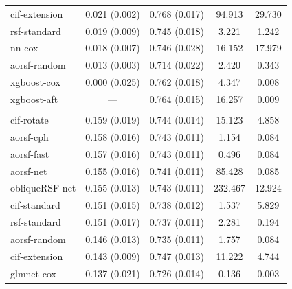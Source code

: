 \documentclass{article}\usepackage[]{graphicx}\usepackage[]{xcolor}
\newenvironment{knitrout}{}{} %
\begin{document}
\begin{knitrout}
\begin{longtable}[t]{lcccc}
\hspace{1em}cif-extension & 0.021 (0.002) & 0.768 (0.017) & 94.913 & 29.730\\
\hspace{1em}rsf-standard & 0.019 (0.009) & 0.745 (0.018) & 3.221 & 1.242\\
\hspace{1em}nn-cox & 0.018 (0.007) & 0.746 (0.028) & 16.152 & 17.979\\
\hspace{1em}aorsf-random & 0.013 (0.003) & 0.714 (0.022) & 2.420 & 0.343\\
\hspace{1em}xgboost-cox & 0.000 (0.025) & 0.762 (0.018) & 4.347 & 0.008\\
\hspace{1em}xgboost-aft & --- & 0.764 (0.015) & 16.257 & 0.009\\
\addlinespace[0.3em]
\multicolumn{5}{l}{\textit{\textbf{Monoclonal gammopathy; death, n = 1384, p = 8}}}\\
\hline
\hspace{1em}cif-rotate & 0.159 (0.019) & 0.744 (0.014) & 15.123 & 4.858\\
\hspace{1em}aorsf-cph & 0.158 (0.016) & 0.743 (0.011) & 1.154 & 0.084\\
\hspace{1em}aorsf-fast & 0.157 (0.016) & 0.743 (0.011) & 0.496 & 0.084\\
\hspace{1em}aorsf-net & 0.155 (0.016) & 0.741 (0.011) & 85.428 & 0.085\\
\hspace{1em}obliqueRSF-net & 0.155 (0.013) & 0.743 (0.011) & 232.467 & 12.924\\
\hspace{1em}cif-standard & 0.151 (0.015) & 0.738 (0.012) & 1.537 & 5.829\\
\hspace{1em}rsf-standard & 0.151 (0.017) & 0.737 (0.011) & 2.281 & 0.194\\
\hspace{1em}aorsf-random & 0.146 (0.013) & 0.735 (0.011) & 1.757 & 0.084\\
\hspace{1em}cif-extension & 0.143 (0.009) & 0.747 (0.013) & 11.222 & 4.744\\
\hspace{1em}glmnet-cox & 0.137 (0.021) & 0.726 (0.014) & 0.136 & 0.003\\

\end{longtable}
\end{knitrout}
\end{document}
